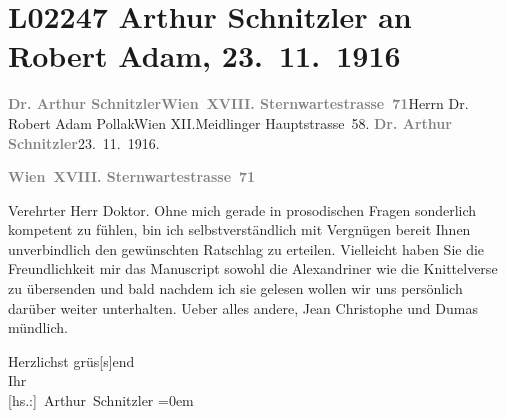 

\section[Arthur Schnitzler an Robert Adam, 23. 11. 1916]{L02247 Arthur Schnitzler an Robert Adam, 23. 11. 1916}
\nopagebreak{}
\rehead{ }\normalsize\beginnumbering{}
\toendnotes[C]{\smallbreak\pagebreak[2]}
\toendnotes[C]{\smallbreak}\pstart{}{\pb}\textcolor{gray}{\textbf{Dr. Arthur Schnitzler}}\pend{}\pstart{}\textcolor{gray}{\textbf{Wien XVIII. Sternwartestrasse 71}}\pend{}{\bigskip}\pstart{}{\pb}Herrn Dr. Robert Adam Pollak\pend{}\pstart{}Wien XII.\pend{}\pstart{}Meidlinger Hauptstrasse 58.\pend{}{\bigskip}\vspace{1em}
\pstart
           {\pb}\textcolor{gray}{\textbf{Dr. Arthur Schnitzler}}\hfill 23. 11. 1916.\pend
           
\pstart
           \textcolor{gray}{\textbf{Wien XVIII. Sternwartestrasse 71}}\pend
           
\pstart\center{}Verehrter Herr Doktor.\pend\vspace{0.5em}
\pstart
           Ohne mich gerade in prosodischen Fragen sonderlich kompetent zu fühlen, bin ich
               selbstverständlich mit Vergnügen bereit Ihnen unverbindlich den gewünschten Ratschlag
               zu erteilen. Vielleicht haben Sie die Freundlichkeit mir das Manuscript sowohl die Alexandriner wie die
               Knittelverse zu übersenden und bald nachdem ich sie gelesen wollen wir uns persönlich
               darüber weiter unterhalten. Ueber alles andere, Jean
                  Christophe und Dumas mündlich.\pend
           
\pstart
           Herzlichst grüs{[}s{]}end{\\[\baselineskip]}Ihr{\\[\baselineskip]}\spacefill\mbox{{[}hs.:{]} Arthur Schnitzler}\pend
           \leftskip=0em{}\endnumbering{}  
      